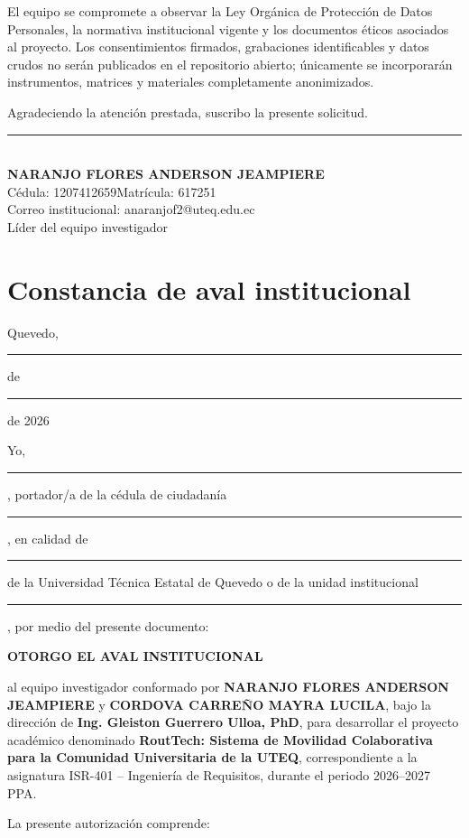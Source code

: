 \documentclass[11pt,a4paper]{article}
\makeatletter
\newcommand{\Proyecto}{RoutTech: Sistema de Movilidad Colaborativa para la Comunidad Universitaria de la UTEQ}
\newcommand{\Asignatura}{ISR-401 -- Ingeniería de Requisitos}
\newcommand{\Periodo}{2026--2027 PPA}
\newcommand{\Docente}{Ing. Gleiston Guerrero Ulloa, PhD}
\newcommand{\Anderson}{NARANJO FLORES ANDERSON JEAMPIERE}
\newcommand{\CedulaAnderson}{1207412659}
\newcommand{\MatriculaAnderson}{617251}
\newcommand{\CorreoAnderson}{anaranjof2@uteq.edu.ec}
\newcommand{\Mayra}{CORDOVA CARREÑO MAYRA LUCILA}
\makeatother
\begin{document}
El equipo se compromete a observar la Ley Orgánica de Protección de Datos Personales, la normativa institucional vigente y los documentos éticos asociados al proyecto. Los consentimientos firmados, grabaciones identificables y datos crudos no serán publicados en el repositorio abierto; únicamente se incorporarán instrumentos, matrices y materiales completamente anonimizados.

Agradeciendo la atención prestada, suscribo la presente solicitud.

\vspace{0.45cm}
\begin{center}
\rule{8.2cm}{0.4pt}\\
\textbf{\Anderson}\\
Cédula: \CedulaAnderson\quad Matrícula: \MatriculaAnderson\\
Correo institucional: \CorreoAnderson\\
Líder del equipo investigador
\end{center}
\normalsize

\clearpage

\section{Constancia de aval institucional}


\vspace{0.25cm}
\begin{flushright}
Quevedo, \rule{1.0cm}{0.4pt} de \rule{3.2cm}{0.4pt} de 2026
\end{flushright}

Yo, \rule{10.2cm}{0.4pt}, portador/a de la cédula de ciudadanía \rule{4.0cm}{0.4pt}, en calidad de \rule{7.0cm}{0.4pt} de la Universidad Técnica Estatal de Quevedo o de la unidad institucional \rule{5.2cm}{0.4pt}, por medio del presente documento:

\begin{center}
{\Large\bfseries\color{RTForest} OTORGO EL AVAL INSTITUCIONAL}
\end{center}

al equipo investigador conformado por \textbf{\Anderson} y \textbf{\Mayra}, bajo la dirección de \textbf{\Docente}, para desarrollar el proyecto académico denominado \textbf{\Proyecto}, correspondiente a la asignatura \Asignatura, durante el periodo \Periodo.

La presente autorización comprende:
\end{document}
